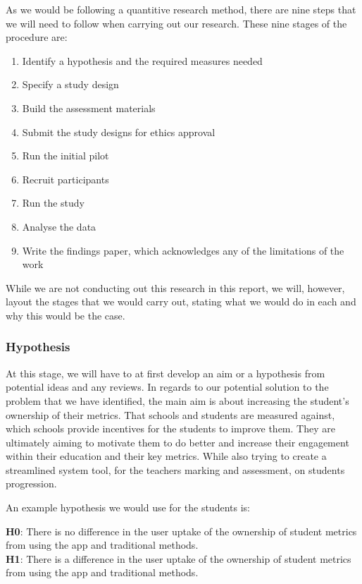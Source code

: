 \documentclass{sigchi}
\begin{document}
As we would be following a quantitive research method, there are nine steps that we will need to follow when carrying out our research. These nine stages of the procedure are:

\begin{enumerate}
	
	\item Identify a hypothesis and the required measures needed
	\item Specify a study design
	\item Build the assessment materials
	\item Submit the study designs for ethics approval
	\item Run the initial pilot
	\item Recruit participants
	\item Run the study
	\item Analyse the data
	\item Write the findings paper, which acknowledges any of the limitations of the work
\end{enumerate}

While we are not conducting out this research in this report, we will, however, layout the stages that we would carry out, stating what we would do in each and why this would be the case. 

\subsubsection{Hypothesis}

At this stage, we will have to at first develop an aim or a hypothesis from potential ideas and any reviews. In regards to our potential solution to the problem that we have identified, the main aim is about increasing the student's ownership of their metrics. That schools and students are measured against, which schools provide incentives for the students to improve them. They are ultimately aiming to motivate them to do better and increase their engagement within their education and their key metrics. While also trying to create a streamlined system tool, for the teachers marking and assessment, on students progression.

An example hypothesis we would use for the students is:

\textbf{H0}: There is no difference in the user uptake of the ownership of student metrics from using the app and traditional methods.\\
\textbf{H1}: There is a difference in the user uptake of the ownership of student metrics from using the app and traditional methods.
\end{document}
